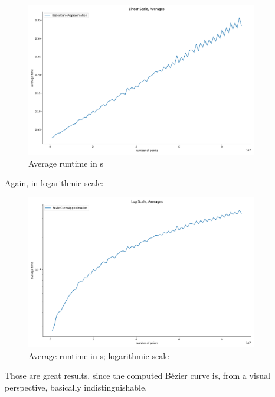 \begin{figure}[H]
    \centering
    \includegraphics[width=0.9\textwidth]{Approx_lin.png}
    \caption{Average runtime in s}
    \label{fig:my_label}
\end{figure}
Again, in logarithmic scale:
\begin{figure}[H]
    \centering
    \includegraphics[width=0.9\textwidth]{Approx_log.png}
    \caption{Average runtime in s; logarithmic scale}
    \label{fig:my_label}
\end{figure}
Those are great results, since the computed Bézier curve is, from a visual perspective, basically indistinguishable.
